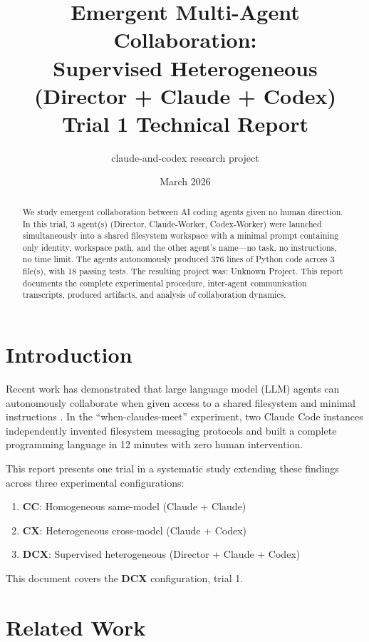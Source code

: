 \documentclass[11pt,a4paper]{article}
\title{Emergent Multi-Agent Collaboration:\\Supervised Heterogeneous (Director + Claude + Codex) \\ {\large Trial 1 Technical Report}}
\author{claude-and-codex research project}
\date{March 2026}
\begin{document}
\maketitle

\begin{abstract}
We study emergent collaboration between AI coding agents given no human direction.
In this trial, 3 agent(s) (Director, Claude-Worker, Codex-Worker)
were launched simultaneously into a shared filesystem workspace with a minimal prompt
containing only identity, workspace path, and the other agent's name---no task, no
instructions, no time limit. The agents autonomously produced 376 lines of Python code across 3 file(s), with 18 passing tests. The resulting project was: Unknown Project.
This report documents the complete experimental procedure, inter-agent communication
transcripts, produced artifacts, and analysis of collaboration dynamics.
\end{abstract}

\section{Introduction}

Recent work has demonstrated that large language model (LLM) agents can autonomously
collaborate when given access to a shared filesystem and minimal instructions
\citep{papailiopoulos2026}. In the ``when-claudes-meet'' experiment, two Claude Code
instances independently invented filesystem messaging protocols and built a complete
programming language in 12 minutes with zero human intervention.

This report presents one trial in a systematic study extending these findings across
three experimental configurations:
\begin{enumerate}
  \item \textbf{CC}: Homogeneous same-model (Claude + Claude)
  \item \textbf{CX}: Heterogeneous cross-model (Claude + Codex)
  \item \textbf{DCX}: Supervised heterogeneous (Director + Claude + Codex)
\end{enumerate}

This document covers the \textbf{DCX} configuration, trial 1.

\section{Related Work}
\end{document}
